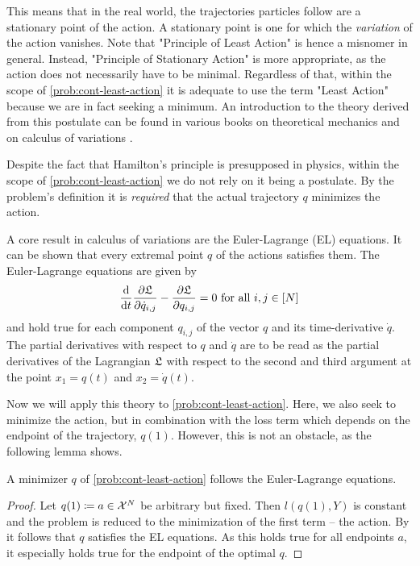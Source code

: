 This means that in the real world, the trajectories particles follow are a stationary point of the action.
A stationary point is one for which the \emph{variation} of the action vanishes.
Note that "Principle of Least Action" is hence a misnomer in general.
Instead, "Principle of Stationary Action" is more appropriate, as the action does not necessarily have to be minimal.
Regardless of that, within the scope of \cref{prob:cont-least-action} it is adequate to use the term "Least Action" because we are in fact seeking a minimum.
An introduction to the theory derived from this postulate can be found in various books on theoretical mechanics \cite{goldstein01, marsden10, feynman63} and on calculus of variations \cite{kielhofer18}.

Despite the fact that Hamilton's principle is presupposed in physics, within the scope of \cref{prob:cont-least-action} we do not rely on it being a postulate.
By the problem's definition it is \emph{required} that the actual trajectory $q$ minimizes the action.

A core result in calculus of variations are the Euler-Lagrange  (EL) equations.
It can be shown that every extremal point $q$ of the actions satisfies them.
The Euler-Lagrange equations are given by
\begin{equation}
\frac{\mathrm{d}}{\mathrm{d}t} \frac{\partial \mathfrak{L}}{\partial \dot{q}_{i, j}} - \frac{\partial \mathfrak{L}}{\partial q_{i, j}} = 0
\ \text{for all}\ i,j \in [N]
\end{equation}
and hold true for each component $q_{i, j}$ of the vector $q$ and its time-derivative $\dot{q}$.
The partial derivatives with respect to $q$ and $\dot{q}$ are to be read as the partial derivatives of the Lagrangian $\mathfrak{L}$ with respect to the second and third argument at the point $x_1 = q(t)$ and $x_2 = \dot{q}(t)$.

Now we will apply this theory to \cref{prob:cont-least-action}.
Here, we also seek to minimize the action, but in combination with the loss term which depends on the endpoint of the trajectory, $q(1)$.
However, this is not an obstacle, as the following lemma shows.
\begin{lemma}
	A minimizer $q$ of \cref{prob:cont-least-action} follows the Euler-Lagrange equations.
\end{lemma}
\begin{proof}
	Let $q(1) \coloneqq a \in \mathcal{X}^N$ be arbitrary but fixed.
	Then $l(q(1), Y)$ is constant and the problem is reduced to the minimization of the first term -- the action.
	By \cite[~Proposition 1.4.1]{kielhofer18} it follows that $q$ satisfies the EL equations.
	As this holds true for all endpoints $a$, it especially holds true for the endpoint of the optimal $q$.
\end{proof}

